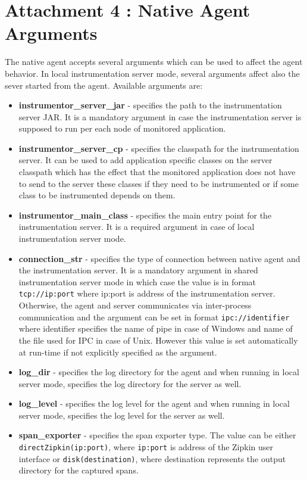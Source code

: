 \documentclass[12pt,a4paper]{report}
\begin{document}
\chapter*{Attachment 4 : Native Agent Arguments}
\setcounter{page}{1}
The native agent accepts several arguments which can be used to affect the agent behavior. In local instrumentation server mode, several arguments affect also the sever started from the agent. Available arguments are:
\begin{itemize}
	\item \textbf{instrumentor\_server\_jar} - specifies the path to the instrumentation server JAR. It is a mandatory argument in case the instrumentation server is supposed to run per each node of monitored application.
	\item \textbf{instrumentor\_server\_cp} - specifies the classpath for the instrumentation server. It can be used to add application specific classes on the server classpath which has the effect that the monitored application does not have to send to the server these classes if they need to be instrumented or if some class to be instrumented depends on them.
	\item \textbf{instrumentor\_main\_class} - specifies the main entry point for the instrumentation server. It is a required argument in case of local instrumentation server mode.
	\item \textbf{connection\_str} - specifies the type of connection between native agent and the instrumentation server. It is a mandatory argument in shared instrumentation server mode in which case the value is in format \texttt{tcp://ip:port} where ip:port is address of the instrumentation server. Otherwise, the agent and server communicates via inter-process communication and the argument can be set in format \texttt{ipc://identifier} where identifier specifies the name of pipe in case of Windows and name of the file used for IPC in case of Unix. However this value is set automatically at run-time if not explicitly specified as the argument.
	\item \textbf{log\_dir} - specifies the log directory for the agent and when running in local server mode, specifies the log directory for the server as well.
	\item \textbf{log\_level} - specifies the log level for the agent and when running in local server mode, specifies the log level for the server as well.
	\item \textbf{span\_exporter} - specifies the span exporter type. The value can be either \linebreak \texttt{directZipkin(ip:port)}, where \texttt{ip:port} is address of the Zipkin user interface or \texttt{disk(destination)}, where destination represents the output directory for the captured spans. 
	

\end{itemize}
\end{document}

